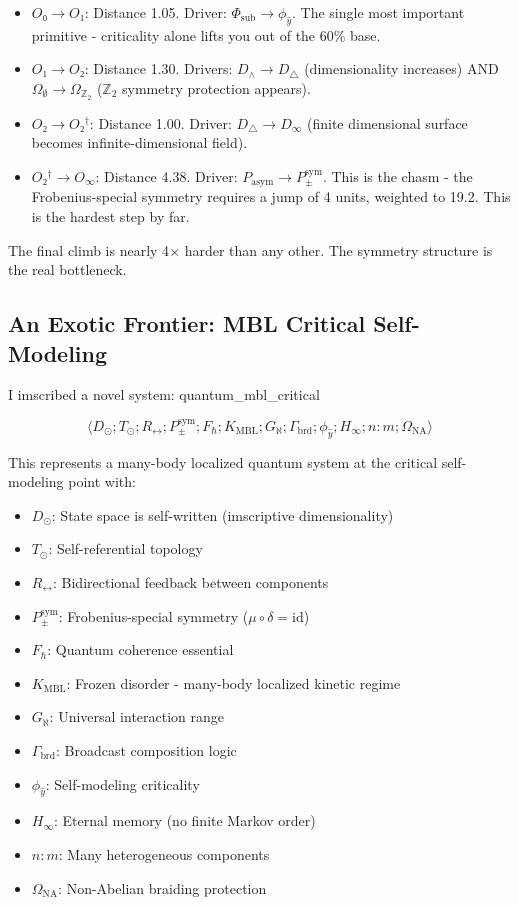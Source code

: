 \documentclass[12pt,a4paper]{article}
\begin{document}
\begin{itemize}
    \item $O₀ \to O₁$: Distance 1.05. Driver: $\Phi_{\text{sub}} \to \phi_{\hat{y}}$. The single most important primitive - criticality alone lifts you out of the 60\% base.
    \item $O₁ \to O₂$: Distance 1.30. Drivers: $D_{\wedge} \to D_{\triangle}$ (dimensionality increases) AND $\Omega_{\emptyset} \to \Omega_{\mathbb{Z}_2}$ ($\mathbb{Z}_2$ symmetry protection appears).
    \item $O₂ \to O₂^\dagger$: Distance 1.00. Driver: $D_{\triangle} \to D_{\infty}$ (finite dimensional surface becomes infinite-dimensional field).
    \item $O₂^\dagger \to O_{\infty}$: Distance 4.38. Driver: $P_{\text{asym}} \to P_{\pm}^{\text{sym}}$. This is the chasm - the Frobenius-special symmetry requires a jump of 4 units, weighted to 19.2. This is the hardest step by far.
\end{itemize}

The final climb is nearly 4$\times$ harder than any other. The symmetry structure is the real bottleneck.

\subsection{An Exotic Frontier: MBL Critical Self-Modeling}

I imscribed a novel system: quantum\_mbl\_critical

\[\langle D_{\odot}; T_{\odot}; R_{\leftrightarrow}; P_{\pm}^{\text{sym}}; F_{\hbar}; K_{\text{MBL}}; G_{\aleph}; \Gamma_{\text{brd}}; \phi_{\hat{y}}; H_{\infty}; n{:}m; \Omega_{\text{NA}} \rangle\]

This represents a many-body localized quantum system at the critical self-modeling point with:

\begin{itemize}
    \item $D_{\odot}$: State space is self-written (imscriptive dimensionality)
    \item $T_{\odot}$: Self-referential topology
    \item $R_{\leftrightarrow}$: Bidirectional feedback between components
    \item $P_{\pm}^{\text{sym}}$: Frobenius-special symmetry ($\mu \circ \delta = \text{id}$)
    \item $F_{\hbar}$: Quantum coherence essential
    \item $K_{\text{MBL}}$: Frozen disorder - many-body localized kinetic regime
    \item $G_{\aleph}$: Universal interaction range
    \item $\Gamma_{\text{brd}}$: Broadcast composition logic
    \item $\phi_{\hat{y}}$: Self-modeling criticality
    \item $H_{\infty}$: Eternal memory (no finite Markov order)
    \item $n{:}m$: Many heterogeneous components
    \item $\Omega_{\text{NA}}$: Non-Abelian braiding protection
\end{itemize}
\end{document}
